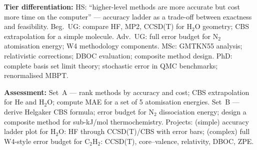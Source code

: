\documentclass[11pt,a4paper]{article}
\begin{document}
\begin{tcolorbox}[modulebox, title={Module~II.1 --- Lecture L11: Benchmark Systems and Accuracy Hierarchies}]
\medskip\textbf{Tier differentiation:}
HS: ``higher-level methods are more accurate but cost more time on the computer'' ---
accuracy ladder as a trade-off between exactness and feasibility.
Beg.\ UG: compare HF, MP2, CCSD(T) for H$_2$O geometry; CBS extrapolation for a simple molecule.
Adv.\ UG: full error budget for N$_2$ atomisation energy; W4 methodology components.
MSc: GMTKN55 analysis; relativistic corrections; DBOC evaluation; composite method design.
PhD: complete basis set limit theory; stochastic error in QMC benchmarks; renormalised MBPT.

\medskip\textbf{Assessment:}
Set~A --- rank methods by accuracy and cost; CBS extrapolation for He and H$_2$O;
compute MAE for a set of 5 atomisation energies.
Set~B --- derive Helgaker CBS formula; error budget for N$_2$ dissociation energy;
design a composite method for sub-kJ/mol thermochemistry.
Projects: (simple) accuracy ladder plot for H$_2$O: HF through CCSD(T)/CBS with error bars;
(complex) full W4-style error budget for C$_2$H$_2$: CCSD(T), core--valence, relativity, DBOC, ZPE.
\end{tcolorbox}

\medskip
\end{document}
